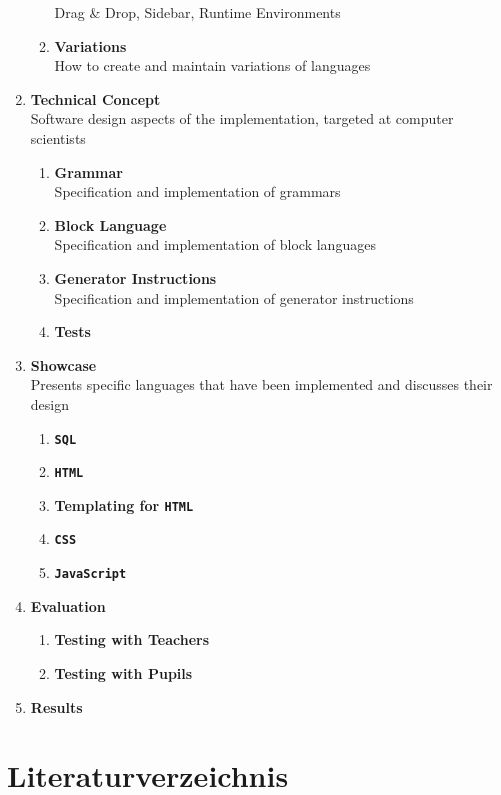 \documentclass[paper=a4,fontsize=11pt,parskip=half]{scrartcl}
\begin{document}
\begin{enumerate}[noitemsep]
\begin{enumerate}
    Drag \& Drop, Sidebar, Runtime Environments
  \item \textbf{Variations}\\
    How to create and maintain variations of languages
  \end{enumerate}
\item \textbf{Technical Concept}\\
  Software design aspects of the implementation, targeted at computer scientists
  \begin{enumerate}
  \item \textbf{Grammar}\\
    Specification and implementation of grammars
  \item \textbf{Block Language}\\
    Specification and implementation of block languages
  \item \textbf{Generator Instructions}\\
    Specification and implementation of generator instructions
  \item \textbf{Tests}
  \end{enumerate}
\item \textbf{Showcase}\\
  Presents specific languages that have been implemented and discusses their design
  \begin{enumerate}
  \item \textbf{\texttt{SQL}}
  \item \textbf{\texttt{HTML}}
  \item \textbf{Templating for \texttt{HTML}}
  \item \textbf{\texttt{CSS}}
  \item \textbf{\texttt{JavaScript}}
  \end{enumerate}
\item \textbf{Evaluation}
  \begin{enumerate}
  \item \textbf{Testing with Teachers}
  \item \textbf{Testing with Pupils}
  \end{enumerate}
\item \textbf{Results}
\end{enumerate}

\newpage

\appendix

\section{Literaturverzeichnis}
\printbibliography[heading=none]
\end{document}
